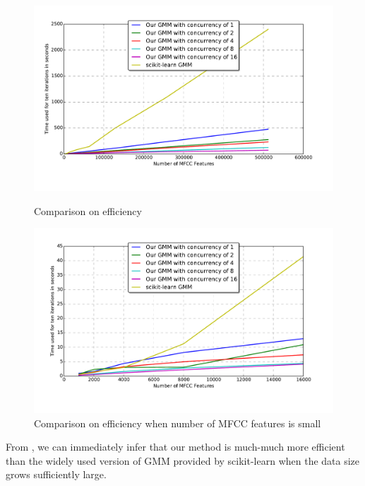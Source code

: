 \begin{figure}[!ht]
	\begin{minipage}{0.48\linewidth}
		\centering
		\includegraphics[width=\linewidth]{img/time-comp.pdf}
		\caption{Comparison on efficiency\label{fig:gmm_efficiency}}
	\end{minipage}
	\hfill
	\begin{minipage}{0.48\linewidth}
		\centering
		\includegraphics[width=\linewidth]{img/time-comp-small.pdf}
		\caption{Comparison on efficiency when number of MFCC features is small\label{fig:gmm_efficiency_small}}
	\end{minipage}
\end{figure}

From , we can immediately infer that our method
is much-much more efficient than the widely used version of GMM provided
by scikit-learn when the data size grows sufficiently large.

